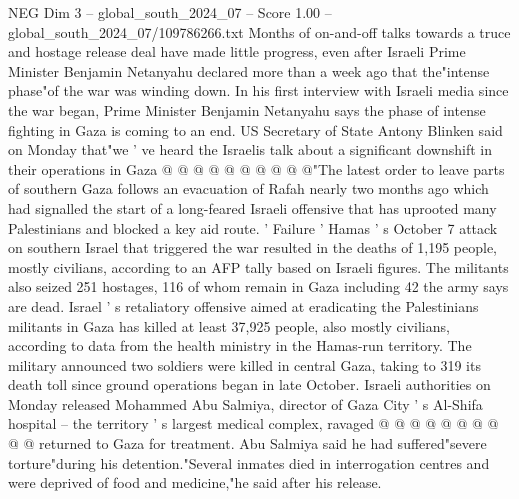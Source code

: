 \begin{textsample}{NEG Dim 3 – global\_south\_2024\_07 – Score 1.00 – global\_south\_2024\_07/109786266.txt}
Months of on-and-off talks towards a truce and hostage release deal have made little progress, even after Israeli Prime Minister Benjamin Netanyahu declared more than a week ago that the"intense phase"of the war was winding down.
In his first interview with Israeli media since the war began, Prime Minister Benjamin Netanyahu says the phase of intense fighting in Gaza is coming to an end.
US Secretary of State Antony Blinken said on Monday that"we ' ve heard the Israelis talk about a significant downshift in their operations in Gaza @ @ @ @ @ @ @ @ @ @"The latest order to leave parts of southern Gaza follows an evacuation of Rafah nearly two months ago which had signalled the start of a long-feared Israeli offensive that has uprooted many Palestinians and blocked a key aid route. ' Failure ' Hamas ' s October 7 attack on southern Israel that triggered the war resulted in the deaths of 1,195 people, mostly civilians, according to an AFP tally based on Israeli figures.
The militants also seized 251 hostages, 116 of whom remain in Gaza including 42 the army says are dead.
Israel ' s retaliatory offensive aimed at eradicating the Palestinians militants in Gaza has killed at least 37,925 people, also mostly civilians, according to data from the health ministry in the Hamas-run territory.
The military announced two soldiers were killed in central Gaza, taking to 319 its death toll since ground operations began in late October.
Israeli authorities on Monday released Mohammed Abu Salmiya, director of Gaza City ' s Al-Shifa hospital -- the territory ' s largest medical complex, ravaged @ @ @ @ @ @ @ @ @ @ returned to Gaza for treatment.
Abu Salmiya said he had suffered"severe torture"during his detention."Several inmates died in interrogation centres and were deprived of food and medicine,"he said after his release.

\end{textsample}
